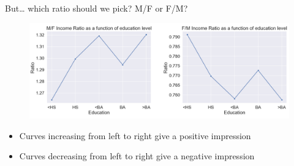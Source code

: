 \documentclass[aspectratio=169]{../latex_main/tntbeamer}  %
\begin{document}
	\begin{frame}{But… which ratio should we pick? M/F or F/M?}
	    \begin{figure}
	        \centering
	        \includegraphics[scale=.38]{Bild58}
	    \end{figure}
	    
	    \begin{itemize}
	        \item Curves increasing from left to right give a positive impression
	        \item Curves decreasing from left to right give a negative impression
	    \end{itemize}
	    
	\end{frame}
\end{document}
